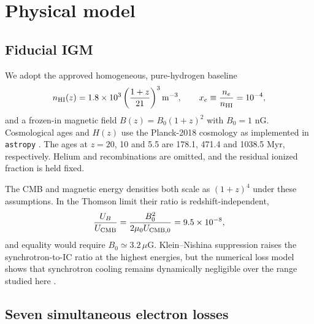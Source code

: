 \documentclass[10pt,twocolumn]{article}
\begin{document}
\section{Physical model}
\label{sec:model}

\subsection{Fiducial IGM}

We adopt the approved homogeneous, pure-hydrogen baseline
\begin{equation}
 n_{\rm HI}(z)=1.8\times10^3\left(\frac{1+z}{21}\right)^3
 \mathrm{m^{-3}},\qquad x_e\equiv\frac{n_e}{n_{\rm HI}}=10^{-4},
 \label{eq:igm}
\end{equation}
and a frozen-in magnetic field
$B(z)=B_0(1+z)^2$ with $B_0=1$ nG. Cosmological ages and $H(z)$ use the
Planck-2018 cosmology as implemented in \texttt{astropy}
\citep{Planck2020,Astropy2022}. The ages at $z=20$, 10 and 5.5 are 178.1,
471.4 and 1038.5 Myr, respectively. Helium and recombinations are omitted, and
the residual ionized fraction is held fixed.

The CMB and magnetic energy densities both scale as $(1+z)^4$ under these
assumptions. In the Thomson limit their ratio is redshift-independent,
\begin{equation}
 \frac{U_B}{U_{\rm CMB}}=\frac{B_0^2}{2\mu_0U_{{\rm CMB},0}}
 =9.5\times10^{-8},                                           \label{eq:ubucmb}
\end{equation}
and equality would require $B_0\simeq3.2\,\mu$G. Klein--Nishina suppression
raises the synchrotron-to-IC ratio at the highest energies, but the numerical
loss model shows that synchrotron cooling remains dynamically negligible over
the range studied here \citep{Blumenthal1970}.

\subsection{Seven simultaneous electron losses}
\end{document}
